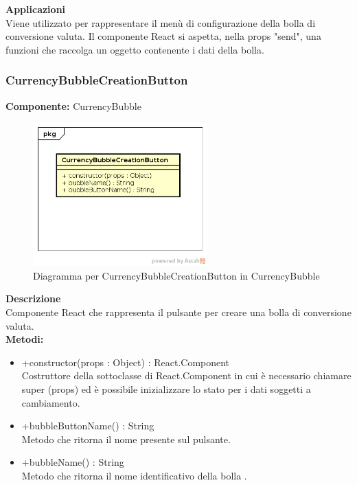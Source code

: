 \textbf{Applicazioni}\\
Viene utilizzato per rappresentare il menù di configurazione della bolla di conversione valuta. Il componente React si aspetta, nella props "send", una funzioni che raccolga un oggetto contenente i dati della bolla. 


\clearpage

\subsubsection{CurrencyBubbleCreationButton}
\textbf{Componente:}  CurrencyBubble\\
   \FloatBarrier
   \begin{figure}[ht]
   \centering
   \includegraphics[width=0.6\textwidth]{img/single-CurrencyBubbleCreationButton}
   \caption{{Diagramma per CurrencyBubbleCreationButton in CurrencyBubble}}
\end{figure}
\FloatBarrier
\textbf{Descrizione}\\
Componente React che rappresenta il pulsante per creare una bolla di conversione valuta.
\\
\textbf{Metodi:} 
\begin{itemize}
\item +constructor(props : Object) : React.Component 
\\
Costruttore della sottoclasse di React.Component in cui è necessario chiamare super (props) ed è possibile inizializzare lo stato per i dati soggetti a cambiamento.

\item +bubbleButtonName() : String 
\\
Metodo che ritorna il nome presente sul pulsante.

\item +bubbleName() : String 
\\
Metodo che ritorna il nome identificativo della bolla .

\end{itemize} 


